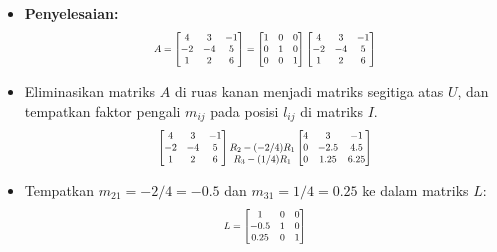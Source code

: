 \documentclass[pdflatex,compress,mathserif]{beamer}
\newcommand*{\Scale}[2][4]{\scalebox{#1}{$#2$}}%
\begin{document}
\begin{frame}
	\begin{itemize}
		\item \textbf{Penyelesaian:}
		\[\Scale[0.7]{ A = 
		\begin{bmatrix}
			4 & 3 & -1\\
			-2 & -4 & 5\\
			1 & 2 & 6\\
		\end{bmatrix}
		=
		\begin{bmatrix}
			1 & 0 & 0\\
			0 & 1 & 0\\
			0 & 0 & 1\\
		\end{bmatrix}
		\begin{bmatrix}
			4 & 3 & -1\\
			-2 & -4 & 5\\
			1 & 2 & 6\\
		\end{bmatrix}
		}\]
		\item Eliminasikan matriks $ A $ di ruas kanan menjadi matriks segitiga atas $ U $, dan tempatkan faktor pengali $ m_{ij} $ pada posisi $ l_{ij} $ di matriks $ I $.
		\[\Scale[0.7]{
		\begin{bmatrix}
			4 & 3 & -1\\
			-2 & -4 & 5\\
			1 & 2 & 6\\
		\end{bmatrix}
		\begin{matrix}
			\\
			R_2 - (-2/4)R_1\\
			R_3 - (1/4)R_1
		\end{matrix}
		\begin{bmatrix}
			4 & 3 & -1\\
			0 & -2.5 & 4.5\\
			0 & 1.25 & 6.25\\
		\end{bmatrix}
		}\]
		\item Tempatkan $ m_{21} = -2/4 = -0.5 $ dan $ m_{31} = 1/4 = 0.25 $ ke dalam matriks $ L $:
		\[\Scale[0.7]{ L = 
		\begin{bmatrix}
			1 & 0 & 0\\
			-0.5 & 1 & 0\\
			0.25 & 0 & 1\\
		\end{bmatrix}
		}\]
	\end{itemize}
\end{frame}
\end{document}
